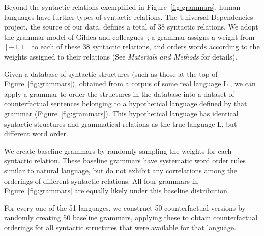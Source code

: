 \documentclass[9pt,twocolumn,twoside,lineno]{pnas-new}
\begin{document}
Beyond the syntactic relations exemplified in Figure~\ref{fig:grammars}, human languages have further types of syntactic relations.
The Universal Dependencies project, the source of our data, defines a total of 38 syntactic relations.
We adopt the grammar model of Gildea and colleagues~\cite{gildea2007optimizing, gildea2010grammars, gildea2015human}; a grammar assigns a weight from $[-1,1]$ to each of these 38 syntactic relations, and orders words according to the weights assigned to their relations
(See \textit{Materials and Methods} for details).

Given a database of syntactic structures (such as those at the top of Figure~\ref{fig:grammars}), obtained from a corpus of some real language L , we can apply a grammar to order the structures in the database into a dataset of counterfactual sentences belonging to a hypothetical language defined by that grammar (Figure~\ref{fig:grammars}).
This hypothetical language has identical syntactic structures and grammatical relations as the true language L, but different word order.

We create baseline grammars by randomly sampling the weights for each syntactic relation.
These baseline grammars have systematic word order rules similar to natural language, but do not exhibit any correlations among the orderings of different syntactic relations.
All four grammars in Figure~\ref{fig:grammars} are equally likely under this baseline distribution.




For every one of the 51 languages, we construct 50 counterfactual versions by randomly creating 50 baseline grammars, applying these to obtain counterfactual orderings for all syntactic structures that were available for that language.
\end{document}
